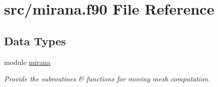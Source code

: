 \hypertarget{mirana_8f90}{\section{src/mirana.f90 File Reference}
\label{mirana_8f90}
}
\subsection*{Data Types}
\begin{DoxyCompactItemize}
\item 
module \hyperlink{classmirana}{mirana}
\begin{DoxyCompactList}\small\item\em Provide the subroutines \& functions for moving mesh computation. \end{DoxyCompactList}\end{DoxyCompactItemize}
